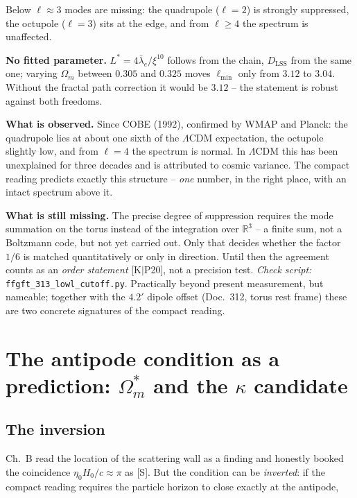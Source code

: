 \noindent Below $\ell \approx 3$ modes are missing: the
quadrupole ($\ell = 2$) is strongly suppressed, the octupole
($\ell = 3$) sits at the edge, and from $\ell \ge 4$ the spectrum
is unaffected.

\textbf{No fitted parameter.} $L^{*} = 4\bar\lambda_e/\xi^{10}$
follows from the chain, $D_\text{LSS}$ from the same one; varying
$\Omega_m$ between $0.305$ and $0.325$ moves $\ell_\text{min}$
only from $3.12$ to $3.04$. Without the fractal path correction it
would be $3.12$ -- the statement is robust against both freedoms.

\textbf{What is observed.} Since COBE (1992), confirmed by WMAP
and Planck: the quadrupole lies at about one sixth of the
$\Lambda$CDM expectation, the octupole slightly low, and from
$\ell = 4$ the spectrum is normal. In $\Lambda$CDM this has been
unexplained for three decades and is attributed to cosmic
variance. The compact reading predicts exactly this structure --
\emph{one} number, in the right place, with an intact spectrum
above it.

\textbf{What is still missing.} The precise degree of suppression
requires the mode summation on the torus instead of the
integration over $\mathbb{R}^3$ -- a finite sum, not a Boltzmann
code, but not yet carried out. Only that decides whether the
factor $1/6$ is matched quantitatively or only in direction. Until
then the agreement counts as an \emph{order statement}
[K$|$P20], not a precision test. \emph{Check script:}
\texttt{ffgft\_313\_lowl\_cutoff.py}. Practically beyond present measurement,
but nameable; together with the $4.2'$ dipole offset (Doc.~312,
torus rest frame) these are two concrete signatures of the compact
reading.

\chapter{The antipode condition as a prediction:
$\Omega_m^{*}$ and the $\kappa$ candidate}

\section{The inversion}

Ch.~B read the location of the scattering wall as a finding and
honestly booked the coincidence $\eta_0 H_0/c \approx \pi$ as
[S]. But the condition can be \emph{inverted}: if the compact
reading requires the particle horizon to close exactly at the
antipode,

